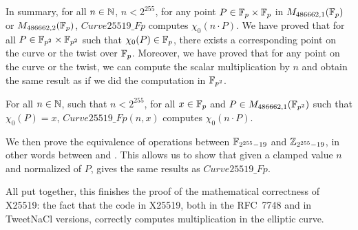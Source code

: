 In summary, for all $n \in \mathbb{N}$, $n < 2^{255}$, for any point $P\in\mathbb{F}_{p}\times\mathbb{F}_{p}$
in $M_{486662,1}(\mathbb{F}_{p})$ or $M_{486662,2}(\mathbb{F}_{p})$, $Curve25519\_Fp$
computes $\chi_0(n \cdot P)$.
We have proved that for all $P \in \mathbb{F}_{p^2}\times\mathbb{F}_{p^2}$ such that $\chi_0(P) \in \mathbb{F}_{p}$,
there exists a corresponding point on the curve or the twist over $\mathbb{F}_{p}$.
Moreover, we have proved that for any point on the curve or the twist, we can compute the
scalar multiplication by $n$ and obtain the same result as if we did the
computation in $\mathbb{F}_{p^2}$.
\begin{theorem}
  \label{thm:general-scalarmult}
  For all $n \in \mathbb{N}$, such that $n < 2^{255}$,
  for all $x \in \mathbb{F}_{p}$ and $P \in M_{486662,1}(\mathbb{F}_{p^2})$ such that $\chi_0(P) = x$,
  $Curve25519\_Fp(n,x)$ computes $\chi_0(n \cdot P)$.
\end{theorem}

We then prove the equivalence of operations between $\mathbb{F}_{2^{255}-19}$ and $\mathbb{Z}_{2^{255}-19}$,
in other words between  and .
This allows us to show that given a clamped value $n$ and normalized \xcoord of $P$,
 gives the same results as $Curve25519\_Fp$.

All put together, this finishes the proof of the mathematical correctness of X25519: the fact that the code in X25519, both in the RFC~7748 and
in TweetNaCl versions, correctly computes multiplication in the elliptic curve.
